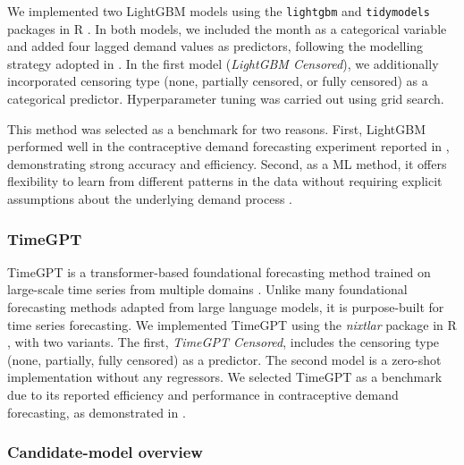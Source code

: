 \documentclass[
  authoryear,
  doubleblind,
  3p]{elsarticle}
\begin{document}
We implemented two LightGBM models using the \texttt{lightgbm} and
\texttt{tidymodels} packages in R \citep{lightgbm, tidymodels}. In both
models, we included the month as a categorical variable and added four
lagged demand values as predictors, following the modelling strategy
adopted in \citet{hewage2025}. In the first model (\emph{LightGBM
Censored}), we additionally incorporated censoring type (none, partially
censored, or fully censored) as a categorical predictor. Hyperparameter
tuning was carried out using grid search.

This method was selected as a benchmark for two reasons. First, LightGBM
performed well in the contraceptive demand forecasting experiment
reported in \citet{hewage2025}, demonstrating strong accuracy and
efficiency. Second, as a ML method, it offers flexibility to learn from
different patterns in the data without requiring explicit assumptions
about the underlying demand process \citep{makridakis2022}.

\subsubsection{TimeGPT}\label{timegpt}

TimeGPT is a transformer-based foundational forecasting method trained
on large-scale time series from multiple domains
\citep{garza2023timegpt1}. Unlike many foundational forecasting methods
adapted from large language models, it is purpose-built for time series
forecasting. We implemented TimeGPT using the \emph{nixtlar} package in
R \citep{nixtlar}, with two variants. The first, \emph{TimeGPT
Censored}, includes the censoring type (none, partially, fully censored)
as a predictor. The second model is a zero-shot implementation without
any regressors. We selected TimeGPT as a benchmark due to its reported
efficiency and performance in contraceptive demand forecasting, as
demonstrated in \citet{hewage2025}.

\subsubsection{Candidate-model overview}\label{candidate-model-overview}

\begingroup\fontsize{6}{8}\selectfont
\end{document}
